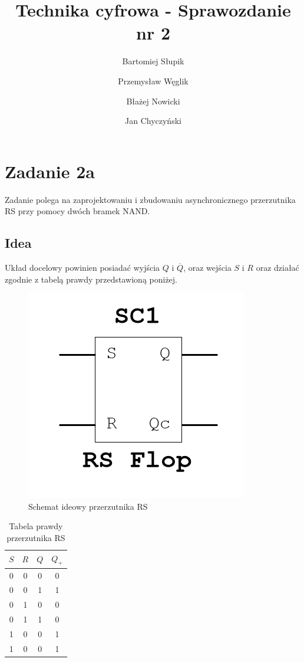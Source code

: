 \documentclass[12pt,a4paper,table]{article}
\title{Technika cyfrowa - Sprawozdanie nr 2}
\author{Bartomiej Słupik \and Przemysław Węglik \and Błażej Nowicki \and Jan Chyczyński}
\begin{document}
    \maketitle    
    \section{Zadanie 2a}
    Zadanie polega na zaprojektowaniu i zbudowaniu asynchronicznego przerzutnika RS przy pomocy dwóch bramek NAND.

    \subsection{Idea}
    Układ docelowy powinien posiadać wyjścia $Q$ i $\overline{Q}$, oraz wejścia $S$ i $R$ oraz działać zgodnie z tabelą prawdy
    przedstawioną poniżej.

    \begin{figure}[h]
        \centering
        \includegraphics[width=0.3\linewidth]{images/rs_idea.PNG}
        \caption{Schemat ideowy przerzutnika RS}
        \label{fig:rs_idea}
    \end{figure}

    \begin{table}[h]
        \centering
        \begin{tabular}{|ccc|c|}
            \hline
            $S$ & $R$ & $Q$ & $Q_+$ \\
            \hline
            0   & 0   & 0   & 0     \\
            0   & 0   & 1   & 1     \\
            \hline
            0   & 1   & 0   & 0     \\
            0   & 1   & 1   & 0     \\
            \hline
            1   & 0   & 0   & 1     \\
            1   & 0   & 0   & 1    \\
            \hline
        \end{tabular}
        \caption{Tabela prawdy przerzutnika RS}
        \label{tab:rs_truthtable}
    \end{table}
\end{document}
